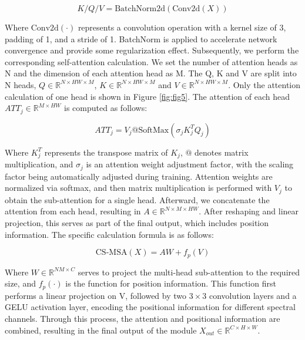 \documentclass[preprint,review,12pt]{elsarticle}
\begin{document}
\begin{equation}
K / Q / V = \text{BatchNorm2d}(\text{Conv2d}(X))
\end{equation}

Where $\text{Conv2d}(\cdot)$ represents a convolution operation with a kernel size of 3, padding of 1, and a stride of 1. BatchNorm is applied to accelerate network convergence and provide some regularization effect. Subsequently, we perform the corresponding self-attention calculation. We set the number of attention heads as N and the dimension of each attention head as M. The Q, K and V are split into N heads, $Q \in \mathbb{R}^{N \times HW \times M}$, $K \in \mathbb{R}^{N \times HW \times M}$ and $V \in \mathbb{R}^{N \times HW \times M}$. Only the attention calculation of one head is shown in Figure \ref{fig:fig5}. The attention of each head $ATT_j \in \mathbb{R}^{M \times HW}$ is computed as follows:

\begin{equation}
ATT_j = V_j @ \text{SoftMax}(\sigma_j K_j^T Q_j)
\end{equation}

Where $K_j^T$ represents the transpose matrix of $K_j$, $@$ denotes matrix multiplication, and $\sigma_j$ is an attention weight adjustment factor, with the scaling factor being automatically adjusted during training. Attention weights are normalized via softmax, and then matrix multiplication is performed with $V_j$ to obtain the sub-attention for a single head. Afterward, we concatenate the attention from each head, resulting in $A \in \mathbb{R}^{N \times M \times HW}$. After reshaping and linear projection, this serves as part of the final output, which includes position information. The specific calculation formula is as follows:

\begin{equation}
\text{CS-MSA}(X) = AW + f_p(V)
\end{equation}

Where $W \in \mathbb{R}^{NM \times C}$ serves to project the multi-head sub-attention to the required size, and $f_p(\cdot)$ is the function for position information. This function first performs a linear projection on V, followed by two $3 \times 3$ convolution layers and a GELU activation layer, encoding the positional information for different spectral channels. Through this process, the attention and positional information are combined, resulting in the final output of the module $X_{out} \in \mathbb{R}^{C \times H \times W}$.
\end{document}
